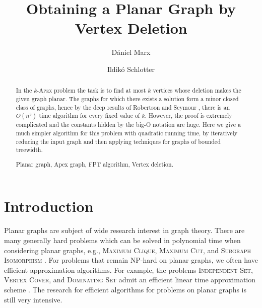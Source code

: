\documentclass{llncs}
\begin{document}
\mainmatter

\title{Obtaining a Planar Graph by Vertex Deletion}
\author{D\'aniel Marx \and Ildik\'o Schlotter}


\maketitle

\begin{abstract}
In the $k$-\textsc{Apex} problem the task is to find at most $k$ vertices
whose deletion makes the given graph planar.
The graphs for which there exists a solution form a minor closed class of graphs,
hence by the deep results of Robertson and Seymour \cite{sey95,sey04}, there is an $O(n^3)$ time algorithm
for every fixed value of $k$. However, the proof is extremely complicated and the constants hidden by
the big-O notation are huge.
Here we give a much simpler algorithm for this problem with quadratic running time, by
iteratively reducing the input graph and then applying techniques for graphs of bounded treewidth.

 Planar graph, Apex graph, FPT algorithm, Vertex deletion.
\end{abstract}




\section{Introduction}

Planar graphs are subject of wide research interest in graph theory.
There are many generally hard problems which can be solved in polynomial time when considering planar graphs,
e.g., \textsc{Maximum Clique}, \textsc{Maximum Cut}, and \textsc{Subgraph Isomorphism}
\cite{epp99,had75}.
For problems that remain NP-hard on planar graphs, we often have efficient approximation algorithms.
For example, the problems \textsc{Independent Set, Vertex Cover}, and  \textsc{Dominating Set}
admit an efficient linear time approximation scheme \cite{bak94,lip80}.
The research for efficient algorithms for problems on planar graphs is still very intensive.
\end{document}
